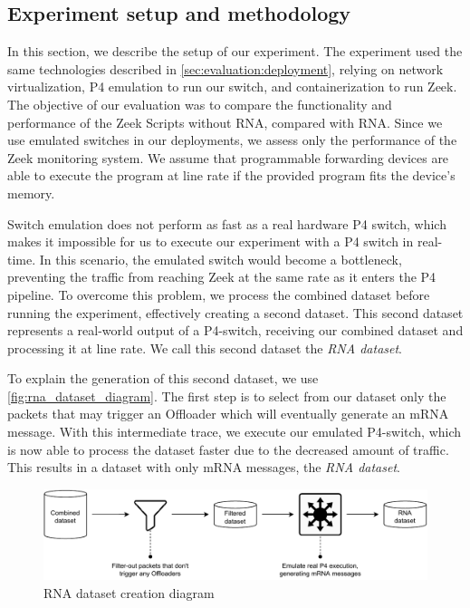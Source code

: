 \subsection{Experiment setup and methodology}
\label{sec:evaluation:setup}

In this section, we describe the setup of our experiment. The experiment used the same technologies described in \autoref{sec:evaluation:deployment}, relying on network virtualization, P4 emulation to run our switch, and containerization to run Zeek. The objective of our evaluation was to compare the functionality and performance of the Zeek Scripts without RNA, compared with RNA. Since we use emulated switches in our deployments, we assess only the performance of the Zeek monitoring system. We assume that programmable forwarding devices are able to execute the program at line rate if the provided program fits the device's memory.

Switch emulation does not perform as fast as a real hardware P4 switch, which makes it impossible for us to execute our experiment with a P4 switch in real-time. In this scenario, the emulated switch would become a bottleneck, preventing the traffic from reaching Zeek at the same rate as it enters the P4 pipeline. To overcome this problem, we process the combined dataset before running the experiment, effectively creating a second dataset. This second dataset represents a real-world output of a P4-switch, receiving our combined dataset and processing it at line rate. We call this second dataset the \textit{RNA dataset}.

To explain the generation of this second dataset, we use \autoref{fig:rna_dataset_diagram}. The first step is to select from our dataset only the packets that may trigger an Offloader which will eventually generate an mRNA message. With this intermediate trace, we execute our emulated P4-switch, which is now able to process the dataset faster due to the decreased amount of traffic. This results in a dataset with only mRNA messages, the \textit{RNA dataset}.



\begin{figure}[htb]
    \caption{RNA dataset creation diagram}
    \begin{center}
        \includegraphics[width=1.0\textwidth]{images/rna_dataset_creation.pdf}  
    \end{center}
    \label{fig:rna_dataset_diagram}
\end{figure}

